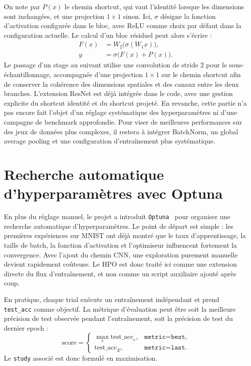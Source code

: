 \documentclass[a4paper,11pt,oneside]{article}
\begin{document}
On note par $P(x)$ le chemin shortcut, qui vaut l'identité lorsque les dimensions sont inchangées, et une projection $1\times1$ sinon. Ici, $\sigma$ désigne la fonction d'activation configurée dans le bloc, avec ReLU comme choix par défaut dans la configuration actuelle. Le calcul d'un bloc résiduel peut alors s'écrire :
\[
\begin{aligned}
F(x) &= W_2\bigl(\sigma(W_1x)\bigr),\\
y &= \sigma\bigl(F(x)+P(x)\bigr).
\end{aligned}
\]
Le passage d'un stage au suivant utilise une convolution de stride $2$ pour le sous-échantillonnage, accompagnée d'une projection $1\times1$ sur le chemin shortcut afin de conserver la cohérence des dimensions spatiales et des canaux entre les deux branches.
L'extension ResNet est déjà intégrée dans le code, avec une gestion explicite du shortcut identité et du shortcut projeté. En revanche, cette partie n'a pas encore fait l'objet d'un réglage systématique des hyperparamètres ni d'une campagne de benchmark approfondie. Pour viser de meilleures performances sur des jeux de données plus complexes, il restera à intégrer BatchNorm, un global average pooling et une configuration d'entraînement plus systématique.

\FloatBarrier
\section{Recherche automatique d'hyperparamètres avec Optuna}

En plus du réglage manuel, le projet a introduit \texttt{Optuna}~\cite{akiba2019optuna} pour organiser une recherche automatique d'hyperparamètres. Le point de départ est simple : les premières expériences sur MNIST ont déjà montré que le taux d'apprentissage, la taille de batch, la fonction d'activation et l'optimiseur influencent fortement la convergence. Avec l'ajout du chemin CNN, une exploration purement manuelle devient rapidement coûteuse. Le HPO est donc traité ici comme une extension directe du flux d'entraînement, et non comme un script auxiliaire ajouté après coup.

En pratique, chaque trial exécute un entraînement indépendant et prend \texttt{test\_acc} comme objectif. La métrique d'évaluation peut être soit la meilleure précision de test observée pendant l'entraînement, soit la précision de test du dernier epoch :
\[
\mathrm{score}=
\begin{cases}
\max_e \mathrm{test\_acc}_e, & \texttt{metric=best},\\
\mathrm{test\_acc}_E, & \texttt{metric=last}.
\end{cases}
\]
Le \texttt{study} associé est donc formulé en maximisation.
\end{document}
